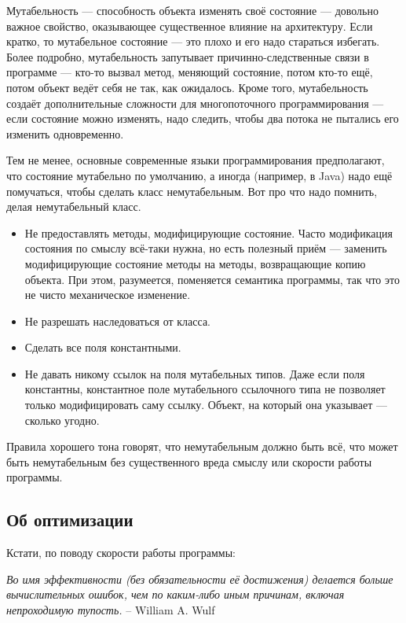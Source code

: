 \documentclass{../text-style}
\begin{document}
Мутабельность --- способность объекта изменять своё состояние --- довольно важное свойство, оказывающее существенное влияние на архитектуру. Если кратко, то мутабельное состояние --- это плохо и его надо стараться избегать. Более подробно, мутабельность запутывает причинно-следственные связи в программе --- кто-то вызвал метод, меняющий состояние, потом кто-то ещё, потом объект ведёт себя не так, как ожидалось. Кроме того, мутабельность создаёт дополнительные сложности для многопоточного программирования --- если состояние можно изменять, надо следить, чтобы два потока не пытались его изменить одновременно.

Тем не менее, основные современные языки программирования предполагают, что состояние мутабельно по умолчанию, а иногда (например, в Java) надо ещё помучаться, чтобы сделать класс немутабельным. Вот про что надо помнить, делая немутабельный класс.

\begin{itemize}
    \item Не предоставлять методы, модифицирующие состояние. Часто модификация состояния по смыслу всё-таки нужна, но есть полезный приём --- заменить модифицирующие состояние методы на методы, возвращающие копию объекта. При этом, разумеется, поменяется семантика программы, так что это не чисто механическое изменение.
    \item Не разрешать наследоваться от класса.
    \item Сделать все поля константными.
    \item Не давать никому ссылок на поля мутабельных типов. Даже если поля константны, константное поле мутабельного ссылочного типа не позволяет только модифицировать саму ссылку. Объект, на который она указывает --- сколько угодно.
\end{itemize}

Правила хорошего тона говорят, что немутабельным должно быть всё, что может быть немутабельным без существенного вреда смыслу или скорости работы программы.

\subsection{Об оптимизации}

Кстати, по поводу скорости работы программы:

\textit{Во имя эффективности (без обязательности её достижения) делается больше вычислительных ошибок, чем по каким-либо иным причинам, включая непроходимую тупость.} \newline
-- William A. Wulf 
\end{document}
